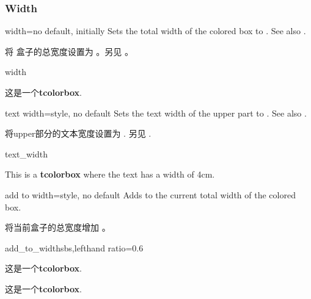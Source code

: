 \subsubsection{Width}

\begin{docTcbKey}{width}{=}{no default, initially }
Sets the total width of the colored box to .
See also .

将%
盒子的总宽度设置为 。另见 。
\begin{exdispExample}{width} 

\begin{tcolorbox}[width=\linewidth/2]
这是一个\textbf{tcolorbox}.
\end{tcolorbox}
\end{exdispExample}
\end{docTcbKey}


\begin{docTcbKey}[][doc new=2014-10-31]{text width}{=}{style, no default}
Sets the text width of the upper part to .
See also .

将upper部分的文本宽度设置为 .
另见 .
\begin{exdispExample}{text_width}

\begin{tcolorbox}[text width=4cm]
This is a \textbf{tcolorbox} where the text has a width of 4cm.
\end{tcolorbox}
\end{exdispExample}
\end{docTcbKey}

\begin{docTcbKey}[][doc new=2014-11-07]{add to width}{=}{style, no default}
Adds  to the current total width of the colored box.

将当前盒子的总宽度增加  。    
\begin{exdispExample*}{add_to_width}{sbs,lefthand ratio=0.6}

\begin{tcolorbox}
这是一个\textbf{tcolorbox}.
\end{tcolorbox}

\begin{tcolorbox}[add to width=1cm]
这是一个\textbf{tcolorbox}.
\end{tcolorbox}
\end{exdispExample*}
\end{docTcbKey}


